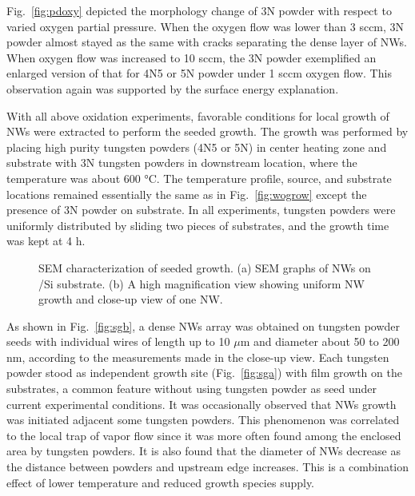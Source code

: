 Fig.~\ref{fig:pdoxy} depicted the morphology change of 3N powder with respect to varied oxygen partial pressure. When the oxygen flow was lower than 3 sccm, 3N powder almost stayed as the same with cracks separating the dense layer of NWs. When oxygen flow was increased to 10 sccm, the 3N powder exemplified an enlarged version of that for 4N5 or 5N powder under 1 sccm oxygen flow. This observation again was supported by the surface energy explanation.

With all above oxidation experiments, favorable conditions for local growth of NWs were extracted to perform the seeded growth. The growth was performed by placing high purity tungsten powders (4N5 or 5N) in center heating zone and substrate with 3N tungsten powders in downstream location, where the temperature was about 600 \si{\degreeCelsius}. The temperature profile, source, and substrate locations remained essentially the same as in Fig.~\ref{fig:wogrow} except the presence of 3N powder on substrate. In all experiments, tungsten powders were uniformly distributed by sliding two pieces of substrates, and the growth time was kept at 4 h.
\begin{figure}[htb]
\centering
{}\hspace{0.04\textwidth}
\caption[SEM characterization of  seeded growth]{SEM characterization of  seeded growth. (a) SEM graphs of  NWs on /Si substrate. (b) A high magnification view showing uniform NW growth and close-up view of one NW.}
\label{fig:woseedsem}
\end{figure}
As shown in Fig.~\ref{fig:sgb}, a dense NWs array was obtained on tungsten powder seeds with individual wires of length up to 10 $\mu$m and diameter about 50 to 200 nm, according to the measurements made in the close-up view. Each tungsten powder stood as independent growth site (Fig.~\ref{fig:sga}) with film growth on the substrates, a common feature without using tungsten powder as seed under current experimental conditions. It was occasionally observed that NWs growth was initiated adjacent some tungsten powders. This phenomenon was correlated to the local trap of vapor flow since it was more often found among the enclosed area by tungsten powders. It is also found that the diameter of NWs decrease as the distance between powders and upstream edge increases. This is a combination effect of lower temperature and reduced  growth species supply. 

